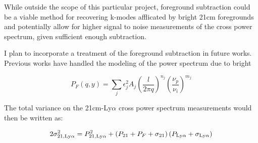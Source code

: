 While outside the scope of this particular project, foreground subtraction could
be a viable method for recovering k-modes afflicated by bright 21cm foregrounds
and potentially allow for higher signal to noise measurements of the cross power
spectrum, given sufficient enough subtraction.

I plan to incorporate a treatment of the foreground subtraction in future works.
Previous works have handled the modeling of the power spectrum due to bright

\begin{equation}
    P_F \left(q, y\right) = \sum_{j} \epsilon_j^2 A_j \left( \frac{l}{2 \pi q} \right)^{n_j} \left( \frac{\nu_p}{\nu_i}\right)^{m_j}
\end{equation}

The total variance on the 21cm-Ly$\alpha$ cross power spectrum measurements would
then be written as:

\begin{equation}
    2 \sigma^2_{21, \rm Ly\alpha} = P^2_{21, \rm Ly\alpha} +
      \left(P_{21} + P_{F} + \sigma_{21} \right) \left( P_{\rm Ly\alpha} + \sigma_{\rm Ly\alpha}\right)
\end{equation}
